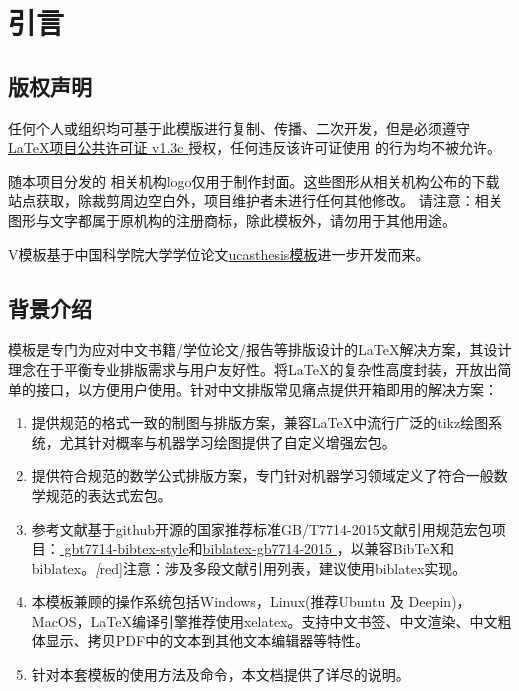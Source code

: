 \chapter{引言} \label{chap:intro}

\section{版权声明}

任何个人或组织均可基于此模版进行复制、传播、二次开发，但是必须遵守
\href{https://www.latex-project.org/lppl/lppl-1-3c/}{\LaTeX{}项目公共许可证 v1.3c } 授权，任何违反该许可证使用 \projectname 的行为均不被允许。

随本项目分发的 相关机构logo仅用于制作封面。这些图形从相关机构公布的下载站点获取，除裁剪周边空白外，项目维护者未进行任何其他修改。 请注意：相关图形与文字都属于原机构的注册商标，除此模板外，请勿用于其他用途。

\projectname V\projectversion 模板基于中国科学院大学学位论文\href{https://github.com/mohuangrui/ucasthesis}{ucasthesis模板}进一步开发而来。

\section{背景介绍}
\projectname 模板是专门为应对中文书籍/学位论文/报告等排版设计的\LaTeX{}解决方案，其设计理念在于平衡专业排版需求与用户友好性。\projectname 将\LaTeX{}的复杂性高度封装，开放出简单的接口，以方便用户使用。针对中文排版常见痛点提供开箱即用的解决方案：
\begin{enumerate}
    \item 提供规范的格式一致的制图与排版方案，兼容\LaTeX{}中流行广泛的tikz绘图系统，尤其针对概率与机器学习绘图提供了自定义增强宏包。
    \item 提供符合规范的数学公式排版方案，专门针对机器学习领域定义了符合一般数学规范的表达式宏包。
    \item 参考文献基于github开源的国家推荐标准GB/T7714-2015文献引用规范宏包项目：\href{https://github.com/zepinglee/gbt7714-bibtex-style}{
gbt7714-bibtex-style}和\href{https://github.com/hushidong/biblatex-gb7714-2015}{biblatex-gb7714-2015
}，以兼容BibTeX和biblatex。\emph[red]{注意：涉及多段文献引用列表，建议使用biblatex实现}。
    \item 本模板兼顾的操作系统包括Windows，Linux(推荐Ubuntu 及 Deepin)，MacOS，\LaTeX{}编译引擎推荐使用xelatex。支持中文书签、中文渲染、中文粗体显示、拷贝PDF中的文本到其他文本编辑器等特性。
    \item 针对本套模板的使用方法及命令，本文档提供了详尽的说明。
\end{enumerate}

